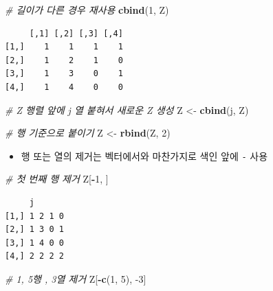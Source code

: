 \documentclass[
  11pt,
]{krantz}
\newenvironment{Shaded}{\begin{snugshade}}{\end{snugshade}}
\newcommand{\CommentTok}[1]{\textcolor[rgb]{0.37,0.37,0.37}{\textit{#1}}}
\newcommand{\DecValTok}[1]{\textcolor[rgb]{0.06,0.06,0.06}{#1}}
\newcommand{\KeywordTok}[1]{\textcolor[rgb]{0.27,0.27,0.27}{\textbf{#1}}}
\newcommand{\NormalTok}[1]{#1}
\newcommand{\OperatorTok}[1]{\textcolor[rgb]{0.43,0.43,0.43}{\textbf{#1}}}
\newcommand{\StringTok}[1]{\textcolor[rgb]{0.5,0.5,0.5}{#1}}
\providecommand{\tightlist}{%
  \setlength{\itemsep}{0pt}\setlength{\parskip}{0pt}}
\begin{document}
\begin{Shaded}
\begin{Highlighting}[]
\CommentTok{# 길이가 다른 경우 재사용}
\KeywordTok{cbind}\NormalTok{(}\DecValTok{1}\NormalTok{, Z)}
\end{Highlighting}
\end{Shaded}

\begin{verbatim}
     [,1] [,2] [,3] [,4]
[1,]    1    1    1    1
[2,]    1    2    1    0
[3,]    1    3    0    1
[4,]    1    4    0    0
\end{verbatim}

\begin{Shaded}
\begin{Highlighting}[]
\CommentTok{# Z 행렬 앞에 j 열 붙혀서 새로운 Z 생성}
\NormalTok{Z <-}\StringTok{ }\KeywordTok{cbind}\NormalTok{(j, Z)}

\CommentTok{# 행 기준으로 붙이기}
\NormalTok{Z <-}\StringTok{ }\KeywordTok{rbind}\NormalTok{(Z, }\DecValTok{2}\NormalTok{)}
\end{Highlighting}
\end{Shaded}

\normalsize

\begin{itemize}
\tightlist
\item
  행 또는 열의 제거는 벡터에서와 마찬가지로 색인 앞에 \texttt{-} 사용
\end{itemize}

\footnotesize

\begin{Shaded}
\begin{Highlighting}[]
\CommentTok{# 첫 번째 행 제거}
\NormalTok{Z[}\OperatorTok{-}\DecValTok{1}\NormalTok{, ]}
\end{Highlighting}
\end{Shaded}

\begin{verbatim}
     j      
[1,] 1 2 1 0
[2,] 1 3 0 1
[3,] 1 4 0 0
[4,] 2 2 2 2
\end{verbatim}

\begin{Shaded}
\begin{Highlighting}[]
\CommentTok{# 1, 5행 , 3열 제거}
\NormalTok{Z[}\OperatorTok{-}\KeywordTok{c}\NormalTok{(}\DecValTok{1}\NormalTok{, }\DecValTok{5}\NormalTok{), }\DecValTok{-3}\NormalTok{]}
\end{Highlighting}
\end{Shaded}
\end{document}
